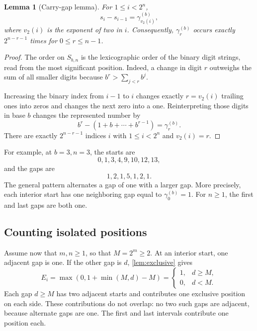 \documentclass[11pt,letterpaper]{article}
\numberwithin{equation}{section}
\newtheorem{lemma}[lemma]{Lemma}
\theoremstyle{definition}
\theoremstyle{remark}
\begin{document}
\begin{lemma}[Carry-gap lemma]\label{lem:carry}
For $1\le i<2^n$,
\begin{equation}\label{eq:gapv2}
 s_i-s_{i-1}=\gamma_{v_2(i)}^{(b)},
\end{equation}
where $v_2(i)$ is the exponent of two in $i$. Consequently, $\gamma_r^{(b)}$ occurs exactly $2^{n-r-1}$ times for $0\le r\le n-1$.
\end{lemma}
\begin{proof}
The order on $S_{b,n}$ is the lexicographic order of the binary digit strings, read from the most significant position. Indeed, a change in digit $r$ outweighs the sum of all smaller digits because $b^r>\sum_{j<r}b^j$.

Increasing the binary index from $i-1$ to $i$ changes exactly $r=v_2(i)$ trailing ones into zeros and changes the next zero into a one. Reinterpreting those digits in base $b$ changes the represented number by
\[
 b^r-(1+b+\cdots+b^{r-1})=\gamma_r^{(b)}.
\]
There are exactly $2^{n-r-1}$ indices $i$ with $1\le i<2^n$ and $v_2(i)=r$.
\end{proof}

For example, at $b=3,n=3$, the starts are
\[
 0,1,3,4,9,10,12,13,
\]
and the gaps are
\[
 1,2,1,5,1,2,1.
\]
The general pattern alternates a gap of one with a larger gap. More precisely, each interior start has one neighboring gap equal to $\gamma_0^{(b)}=1$. For $n\ge1$, the first and last gaps are both one.

\subsection{Counting isolated positions}
Assume now that $m,n\ge1$, so that $M=2^m\ge2$. At an interior start, one adjacent gap is one. If the other gap is $d$, \cref{lem:exclusive} gives
\[
 E_i=\max(0,1+\min(M,d)-M)
 =\begin{cases}1,&d\ge M,\\0,&d<M.\end{cases}
\]
Each gap $d\ge M$ has two adjacent starts and contributes one exclusive position on each side. These contributions do not overlap: no two such gaps are adjacent, because alternate gaps are one. The first and last intervals contribute one position each.
\end{document}
